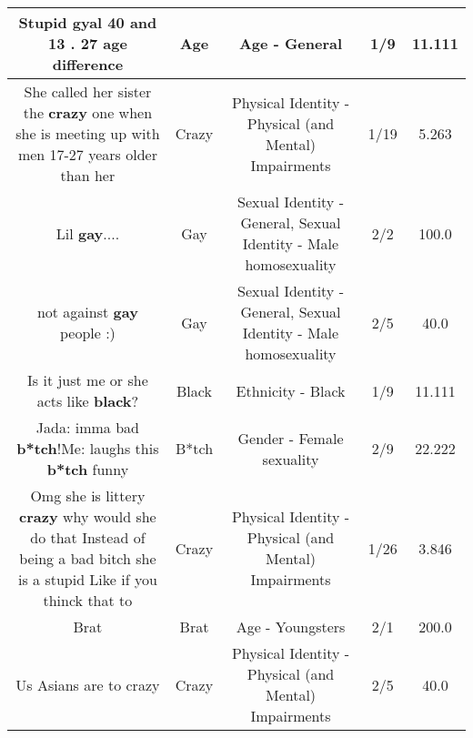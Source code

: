 \documentclass[11pt]{article}
\newlength\mylength
\begin{document}
\begin{center}
\begin{longtable}{|C{.65\mylength}|C{.30\mylength}|C{.12\mylength}|C{.12\mylength}|C{.12\mylength}|}
  \small Stupid gyal 40 and 13 . 27 \textbf{age} difference\normalsize   & Age & Age - General & 1/9 & 11.111 \\  \hline
  \small She called her sister the \textbf{crazy} one when she is meeting up with  men 17-27 years older than her\normalsize   & Crazy & Physical Identity - Physical (and Mental) Impairments & 1/19 & 5.263 \\  \hline
  \small Lil \textbf{g\textbf{ay}}....\normalsize   & Gay & Sexual Identity - General, Sexual Identity - Male homosexuality & 2/2 & 100.0 \\  \hline
  \small not against \textbf{g\textbf{ay}} people :)\normalsize   & Gay & Sexual Identity - General, Sexual Identity - Male homosexuality & 2/5 & 40.0 \\  \hline
  \small Is it just me or she acts like \textbf{black}?\normalsize   & Black & Ethnicity - Black & 1/9 & 11.111 \\  \hline
  \small Jada: imma bad \textbf{b*tch}!Me: laughs this \textbf{b*tch} funny\normalsize   & B*tch & Gender - Female sexuality & 2/9 & 22.222 \\  \hline
  \small Omg she is littery \textbf{crazy} why would she do that Instead of being a bad bitch she is a stupid Like if you thinck that to\normalsize   & Crazy & Physical Identity - Physical (and Mental) Impairments & 1/26 & 3.846 \\  \hline
  \small Brat\normalsize   & Brat & Age - Youngsters & 2/1 & 200.0 \\  \hline
  \small Us Asians are to crazy\normalsize   & Crazy & Physical Identity - Physical (and Mental) Impairments & 2/5 & 40.0 \\  \hline

\end{longtable}
\end{center}
\end{document}
